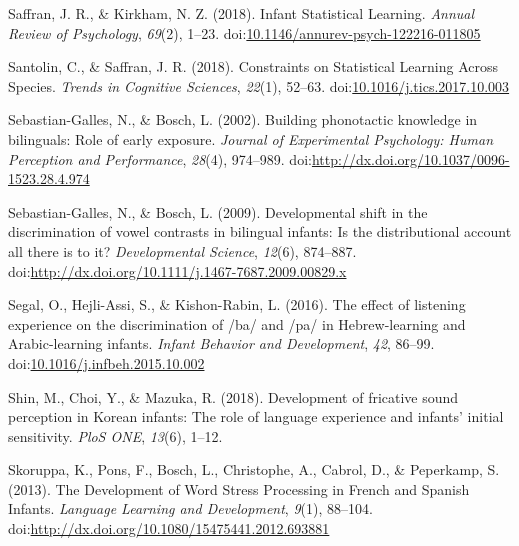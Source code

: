 \documentclass[man,floatsintext]{apa6}
\begin{document}
\leavevmode\hypertarget{ref-saffran2018}{}%
Saffran, J. R., \& Kirkham, N. Z. (2018). Infant Statistical Learning. \emph{Annual Review of Psychology}, \emph{69}(2), 1--23. doi:\href{https://doi.org/10.1146/annurev-psych-122216-011805}{10.1146/annurev-psych-122216-011805}

\leavevmode\hypertarget{ref-santolin2018}{}%
Santolin, C., \& Saffran, J. R. (2018). Constraints on Statistical Learning Across Species. \emph{Trends in Cognitive Sciences}, \emph{22}(1), 52--63. doi:\href{https://doi.org/10.1016/j.tics.2017.10.003}{10.1016/j.tics.2017.10.003}

\leavevmode\hypertarget{ref-sebastiangalles2002}{}%
Sebastian-Galles, N., \& Bosch, L. (2002). Building phonotactic knowledge in bilinguals: Role of early exposure. \emph{Journal of Experimental Psychology: Human Perception and Performance}, \emph{28}(4), 974--989. doi:\href{https://doi.org/http://dx.doi.org/10.1037/0096-1523.28.4.974}{http://dx.doi.org/10.1037/0096-1523.28.4.974}

\leavevmode\hypertarget{ref-sebastiangalles2009}{}%
Sebastian-Galles, N., \& Bosch, L. (2009). Developmental shift in the discrimination of vowel contrasts in bilingual infants: Is the distributional account all there is to it? \emph{Developmental Science}, \emph{12}(6), 874--887. doi:\href{https://doi.org/http://dx.doi.org/10.1111/j.1467-7687.2009.00829.x}{http://dx.doi.org/10.1111/j.1467-7687.2009.00829.x}

\leavevmode\hypertarget{ref-segal2016}{}%
Segal, O., Hejli-Assi, S., \& Kishon-Rabin, L. (2016). The effect of listening experience on the discrimination of /ba/ and /pa/ in Hebrew-learning and Arabic-learning infants. \emph{Infant Behavior and Development}, \emph{42}, 86--99. doi:\href{https://doi.org/10.1016/j.infbeh.2015.10.002}{10.1016/j.infbeh.2015.10.002}

\leavevmode\hypertarget{ref-shin2018}{}%
Shin, M., Choi, Y., \& Mazuka, R. (2018). Development of fricative sound perception in Korean infants: The role of language experience and infants' initial sensitivity. \emph{PloS ONE}, \emph{13}(6), 1--12.

\leavevmode\hypertarget{ref-skoruppa2013}{}%
Skoruppa, K., Pons, F., Bosch, L., Christophe, A., Cabrol, D., \& Peperkamp, S. (2013). The Development of Word Stress Processing in French and Spanish Infants. \emph{Language Learning and Development}, \emph{9}(1), 88--104. doi:\href{https://doi.org/http://dx.doi.org/10.1080/15475441.2012.693881}{http://dx.doi.org/10.1080/15475441.2012.693881}
\end{document}
